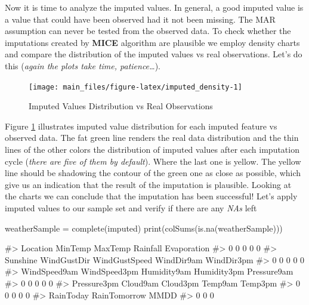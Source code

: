 Now it is time to analyze the imputed values. In general, a good imputed
value is a value that could have been observed had it not been missing.
The MAR assumption can never be tested from the observed data. To check
whether the imputations created by \textbf{MICE} algorithm are plausible
we employ density charts and compare the distribution of the imputed
values vs real observations. Let's do this (\emph{again the plots take
time, patience\ldots{}}).

\begin{Schunk}
\begin{figure}[H]

{\centering \texttt{[image: main\_files/figure-latex/imputed\_density-1]} 

}

\caption[Imputed Values Distribution vs Real Observations]{Imputed Values Distribution vs Real Observations}\label{fig:imputed_density}
\end{figure}
\end{Schunk}

Figure \ref{fig:imputed_density} illustrates imputed value distribution
for each imputed feature vs observed data. The fat green line renders
the real data distribution and the thin lines of the other colors the
distribution of imputed values after each imputation cycle (\emph{there
are five of them by default}). Where the last one is yellow. The yellow
line should be shadowing the contour of the green one as close as
possible, which give us an indication that the result of the imputation
is plausible. Looking at the charts we can conclude that the imputation
has been successful! Let's apply imputed values to our sample set and
verify if there are any \emph{NAs} left

\begin{Schunk}
\begin{Sinput}
weatherSample = complete(imputed)
print(colSums(is.na(weatherSample)))
\end{Sinput}
\begin{Soutput}
#>      Location       MinTemp       MaxTemp      Rainfall   Evaporation 
#>             0             0             0             0             0 
#>      Sunshine   WindGustDir WindGustSpeed    WindDir9am    WindDir3pm 
#>             0             0             0             0             0 
#>  WindSpeed9am  WindSpeed3pm   Humidity9am   Humidity3pm   Pressure9am 
#>             0             0             0             0             0 
#>   Pressure3pm      Cloud9am      Cloud3pm       Temp9am       Temp3pm 
#>             0             0             0             0             0 
#>     RainToday  RainTomorrow          MMDD 
#>             0             0             0
\end{Soutput}
\end{Schunk}

